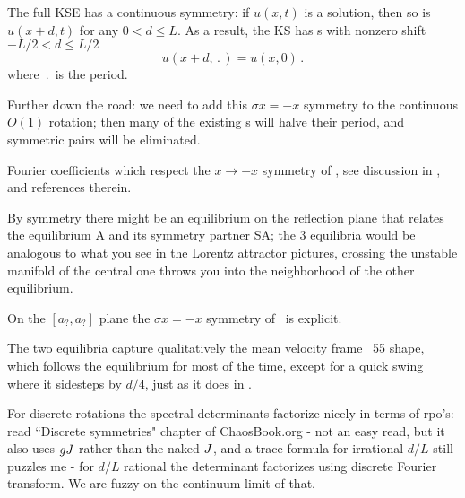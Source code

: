 The full KSE has a continuous symmetry: if
$u(x,t)$ is a solution, then so is $u(x+d,t)$ for any
$0 < d \leq L$.  As a result,
the KS has \rpo s with nonzero shift $-L/2 < d \leq L/2$
\[ u(x+d,\period{}) = u(x,0)
\,.
\]
where $\period{}$ is the period. 

Further down the road: we need to add this
$\sigma x = -x$ symmetry
 to the continuous $O(1)$ rotation; then many of the existing \rpo s will
 halve their period, and symmetric pairs will be eliminated.

Fourier coefficients which respect the $x \to -x$ symmetry of
\KSe, see discussion in ,
and references therein.

By symmetry there might be an equilibrium on the reflection plane that
relates the equilibrium A and its symmetry partner SA; the 3 equilibria would
be analogous to what you see in the Lorentz attractor pictures, crossing
the unstable manifold of the central one throws you into the neighborhood
of the other equilibrium.

On the 
	$[a_?,a_?]$ plane
	the $\sigma x = -x$ symmetry of \KSe\ is explicit.

The two equilibria
capture qualitatively the mean velocity frame \rpo\ {\nameit}55 shape,
which follows the
equilibrium for most of the time, except for a quick swing where it
sidesteps by $d/4$, just as it does in . 

For discrete rotations the spectral determinants factorize
nicely in terms of rpo's:
read ``Discrete symmetries" chapter of ChaosBook.org - not an easy read, but
it also uses $g{J}$ rather than the naked ${J}$,
and a trace formula for irrational
$d/L$ still puzzles me - for $d/L$ rational the determinant factorizes using
discrete Fourier transform.
We are fuzzy on the continuum limit of that.

